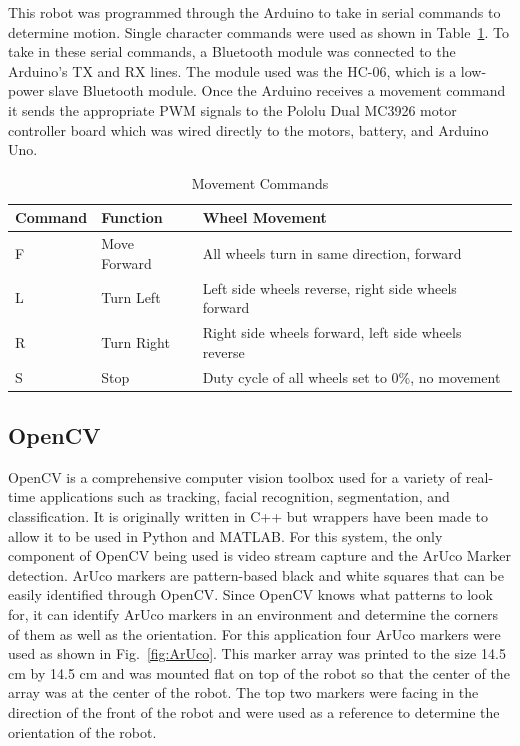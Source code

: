 \documentclass[12pt,american]{report}
\begin{document}
This robot was programmed through the Arduino to take in serial commands to determine motion.  Single character commands were used as shown in Table~\ref{tab:movement}. To take in these serial commands, a Bluetooth module was connected to the Arduino's TX and RX lines.  The module used was the HC-06, which is a low-power slave Bluetooth module. Once the Arduino receives a movement command it sends the appropriate PWM signals to the Pololu Dual MC3926 motor controller board which was wired
directly to the motors, battery, and Arduino Uno. 
\begin{table}[h!]
\centering
\caption{Movement Commands}
\label{tab:movement}
\begin{tabular}{|p{1.5cm}|p{1cm}|p{3cm}|}
\hline
\textbf{Command} & \textbf{Function} & \textbf{Wheel Movement} \\ \hline
F & Move Forward & All wheels turn in same direction, forward \\ \hline
L & Turn Left & Left side wheels reverse, right side wheels forward \\ \hline
R & Turn Right & Right side wheels forward, left side wheels reverse \\ \hline
S & Stop & Duty cycle of all wheels set to 0\%, no movement \\ \hline
\end{tabular}
\end{table}

\subsection{OpenCV}

OpenCV is a comprehensive computer vision toolbox used for a variety of real-time applications such as tracking, facial recognition, segmentation, and classification. It is originally written in C++ but wrappers have been made to allow it to be used in Python and MATLAB. For this system, the only component of OpenCV being used is video stream capture and the ArUco Marker detection.  ArUco markers are pattern-based black and white squares that can be easily identified through OpenCV.  Since OpenCV knows what patterns to look for, it can identify ArUco markers in an environment and determine the corners of them as well as the orientation. For this application four ArUco markers were used as shown in Fig.~\ref{fig:ArUco}. This marker array was printed to the size 14.5 cm by 14.5 cm and was  mounted flat on top of the robot so that the center of the array was at the center of the robot.  The top two markers were facing in the direction of the front of the robot and were used as a reference to determine the orientation of the robot.
\end{document}
